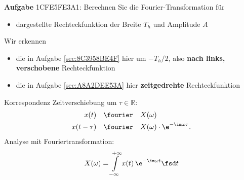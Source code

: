 \textbf{Aufgabe} {\tiny 1CFE5FE3A1}: Berechnen Sie die Fourier-Transformation für
\begin{itemize}
\item dargestellte Rechteckfunktion der Breite $T_h$ und Amplitude $A$
\end{itemize}
%
\begin{figure}[h!]
\centering
{}
\end{figure}
%
Wir erkennen
\begin{itemize}
\item die in Aufgabe \ref{sec:8C3958BE4F} hier um $-T_h/2$, also \textbf{nach links,
verschobene} Rechteckfunktion
\item die in Aufgabe \ref{sec:A8A2DEE53A} hier \textbf{zeitgedrehte} Rechteckfunktion
\end{itemize}

\begin{Werkzeug}
Korrespondenz Zeitverschiebung um $\tau\in\mathbb{R}$:
\begin{align}
x(t) & \quad \fourier \quad X(\omega)\\
x(t - \tau) & \quad \fourier \quad X(\omega) \cdot \e^{-\im\omega \tau}.
\end{align}
Analyse mit Fouriertransformation:
\begin{align}
X(\omega) = \int\limits_{-\infty}^{+\infty} x(t) \, \e^{-\im \omega t} \fsd t
\end{align}
\end{Werkzeug}

